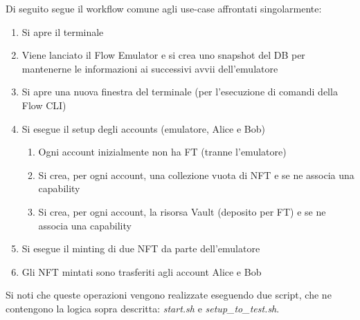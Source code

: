 Di seguito segue il workflow comune agli use-case affrontati singolarmente:
\begin{enumerate}
    \item Si apre il terminale
    \item Viene lanciato il Flow Emulator e si crea uno snapshot del DB per mantenerne le informazioni ai successivi avvii dell'emulatore
    \item Si apre una nuova finestra del terminale (per l'esecuzione di comandi della Flow CLI)
    \item Si esegue il setup degli accounts (emulatore, Alice e Bob)
    \begin{enumerate}
        \item Ogni account inizialmente non ha FT (tranne l'emulatore)
        \item Si crea, per ogni account, una collezione vuota di NFT e se ne associa una capability 
        \item Si crea, per ogni account, la risorsa Vault (deposito per FT) e se ne associa una capability
    \end{enumerate}
    \item Si esegue il minting di due NFT da parte dell'emulatore 
    \item Gli NFT mintati sono trasferiti agli account Alice e Bob
\end{enumerate}
Si noti che queste operazioni vengono realizzate eseguendo due script, che ne contengono la logica sopra descritta: \textit{start.sh} e \textit{setup\_to\_test.sh}.





